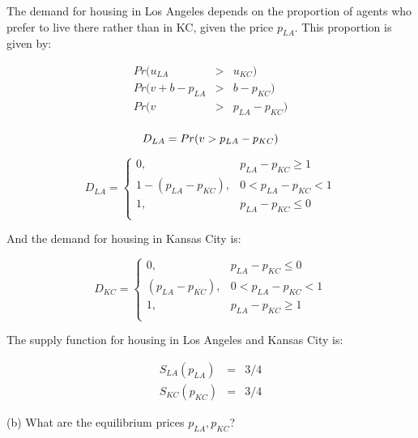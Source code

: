 The demand for housing in Los Angeles depends on the proportion of agents who prefer to live there rather than in KC, given the price \( p_{LA} \). This proportion is given by:


\begin{eqnarray*}
    Pr(u_{LA} &>& u_{KC})\\
    Pr(v + b - p_{LA} &>& b - p_{KC})\\
    Pr(v &>& p_{LA} - p_{KC})\\
\end{eqnarray*}

\begin{equation}
    D_{LA} = Pr(v > p_{LA} - p_{KC})\\
\end{equation}

\begin{equation}
    D_{LA} = \begin{cases}
        0, &  p_{LA} - p_{KC} \geq 1\\
        1 - (p_{LA} - p_{KC}), & 0 < p_{LA} - p_{KC} < 1\\
        1, &  p_{LA} - p_{KC} \leq 0\\
    \end{cases}
\end{equation}

And the demand for housing in Kansas City is:

\begin{equation}
    D_{KC} = \begin{cases}
        0, &  p_{LA} - p_{KC} \leq 0\\
        (p_{LA} - p_{KC}), & 0 < p_{LA} - p_{KC} < 1\\
        1, &  p_{LA} - p_{KC} \geq 1\\
    \end{cases}
\end{equation}

The supply function for housing in Los Angeles and Kansas City is:

\begin{eqnarray}
    S_{LA}(p_{LA}) &=& 3/4\\
    S_{KC}(p_{KC}) &=& 3/4
\end{eqnarray}
\begin{tcolorbox}
    (b) What are the equilibrium prices \( p_{LA}, p_{KC} \)?
\end{tcolorbox}

